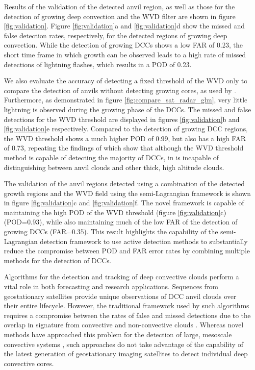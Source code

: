 \documentclass[amt, manuscript]{copernicus}
\begin{document}
Results of the validation of the detected anvil region, as well as those for the detection of growing deep convection and the WVD filter are shown in figure \ref{fig:validation}.
Figure \ref{fig:validation}a and \ref{fig:validation}d show the missed and false detection rates, respectively, for the detected regions of growing deep convection.
While the detection of growing DCCs shows a low FAR of 0.23, the short time frame in which growth can be observed leads to a high rate of missed detections of lightning flashes, which results in a POD of 0.23.


We also evaluate the accuracy of detecting a fixed threshold of the WVD only to compare the detection of anvils without detecting growing cores, as used by \citet{muller_role_2018}.
Furthermore, as demonstrated in figure \ref{fig:compare_sat_radar_glm}, very little lightning is observed during the growing phase of the DCCs.
The missed and false detections for the WVD threshold are displayed in figures \ref{fig:validation}b and \ref{fig:validation}e respectively.
Compared to the detection of growing DCC regions, the WVD threshold shows a much higher POD of 0.99, but also has a high FAR of 0.73, repeating the findings of \citet{muller_novel_2019} which show that although the WVD threshold method is capable of detecting the majority of DCCs, in is incapable of distinguishing between anvil clouds and other thick, high altitude clouds.

The validation of the anvil regions detected using a combination of the detected growth regions and the WVD field using the semi-Lagrangian framework is shown in figure \ref{fig:validation}c and \ref{fig:validation}f.
The novel framework is capable of maintaining the high POD of the WVD threshold (figure \ref{fig:validation}c) (POD=0.93), while also maintaining much of the low FAR of the detection of growing DCCs (FAR=0.35).
This result highlights the capability of the semi-Lagrangian detection framework to use active detection methods to substantially reduce the compromise between POD and FAR error rates by combining multiple methods for the detection of DCCs.


\conclusions  %

Algorithms for the detection and tracking of deep convective clouds perform a vital role in both forecasting and research applications.
Sequences from geostationary satellites provide unique observations of DCC anvil clouds over their entire lifecycle.
However, the traditional framework used by such algorithms requires a compromise between the rates of false and missed detections due to the overlap in signature from convective and non-convective clouds \citep{konduru_new_2013}.
Whereas novel methods have approached this problem for the detection of large, mesoscale convective systems \citep{fiolleau_algorithm_2013}, such approaches do not take advantage of the capability of the latest generation of geostationary imaging satellites to detect individual deep convective cores.
\end{document}
